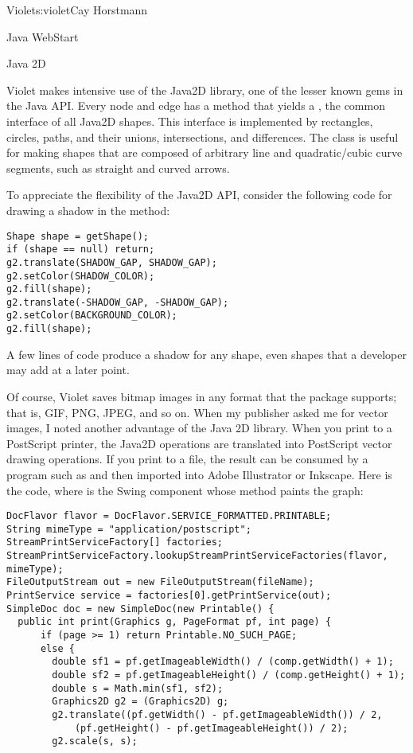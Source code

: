 \begin{aosachapter}{Violet}{s:violet}{Cay Horstmann}
\begin{aosasect1}{Java WebStart}
\end{aosasect1}

\begin{aosasect1}{Java 2D}

Violet makes intensive use of the Java2D library, one of the lesser
known gems in the Java API\@. Every node and edge has a method
 that yields a , the common
interface of all Java2D shapes. This interface is implemented by
rectangles, circles, paths, and their unions, intersections, and
differences. The  class is useful for making shapes
that are composed of arbitrary line and quadratic/cubic curve
segments, such as straight and curved arrows.

To appreciate the flexibility of the Java2D API, consider the
following code for drawing a
shadow in the  method:

\begin{verbatim}
Shape shape = getShape();
if (shape == null) return;
g2.translate(SHADOW_GAP, SHADOW_GAP);
g2.setColor(SHADOW_COLOR);
g2.fill(shape);
g2.translate(-SHADOW_GAP, -SHADOW_GAP);
g2.setColor(BACKGROUND_COLOR);
g2.fill(shape);
\end{verbatim}

\noindent A few lines of code produce a shadow for any shape, even shapes that a
developer may add at a later point.

Of course, Violet saves bitmap images in any format that the
 package supports; that is, GIF, PNG, JPEG, and so
on. When my publisher asked me for vector images, I noted another
advantage of the Java 2D library. When you print to a PostScript
printer, the Java2D operations are translated into PostScript vector
drawing operations. If you print to a file, the result can be consumed
by a program such as  and then imported into Adobe
Illustrator or Inkscape. Here is the code, where  is the
Swing component whose  method paints the graph:

\begin{verbatim}
DocFlavor flavor = DocFlavor.SERVICE_FORMATTED.PRINTABLE;
String mimeType = "application/postscript";
StreamPrintServiceFactory[] factories;
StreamPrintServiceFactory.lookupStreamPrintServiceFactories(flavor, mimeType);
FileOutputStream out = new FileOutputStream(fileName);
PrintService service = factories[0].getPrintService(out);            
SimpleDoc doc = new SimpleDoc(new Printable() {
  public int print(Graphics g, PageFormat pf, int page) {
      if (page >= 1) return Printable.NO_SUCH_PAGE;
      else {
        double sf1 = pf.getImageableWidth() / (comp.getWidth() + 1);
        double sf2 = pf.getImageableHeight() / (comp.getHeight() + 1);
        double s = Math.min(sf1, sf2);
        Graphics2D g2 = (Graphics2D) g;
        g2.translate((pf.getWidth() - pf.getImageableWidth()) / 2, 
            (pf.getHeight() - pf.getImageableHeight()) / 2);
        g2.scale(s, s);
                        

\end{verbatim}
\end{aosasect1}
\end{aosachapter}
